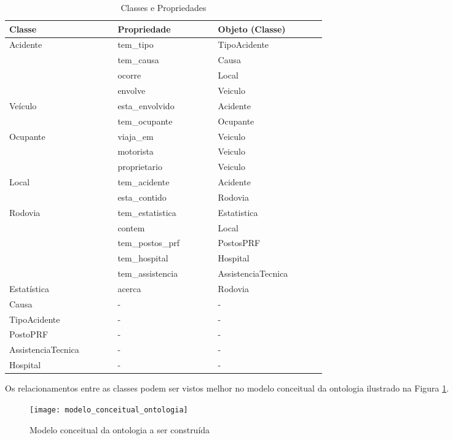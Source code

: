 	  \begin{table*}[!h]
	  \centering
	  \begin{tabular}{p{0.2\linewidth}p{0.20\linewidth}p{0.20\linewidth}}
	    \hline
	    \textbf{Classe} & \textbf{Propriedade} & \textbf{Objeto (Classe)}\\
	    \hline
	      Acidente & tem\_tipo & TipoAcidente\\
		& tem\_causa & Causa\\
		& ocorre & Local\\
		& envolve & Veiculo\\
	    \hline
	      Veículo & esta\_envolvido & Acidente\\
		& tem\_ocupante & Ocupante\\
	    \hline
	      Ocupante & viaja\_em & Veiculo\\
		& motorista & Veiculo\\
		& proprietario & Veiculo\\
	    \hline
	      Local & tem\_acidente & Acidente\\
		& esta\_contido & Rodovia\\
	    \hline
	      Rodovia & tem\_estatistica & Estatistica\\
		& contem & Local\\
		& tem\_postos\_prf & PostosPRF\\
		& tem\_hospital & Hospital\\
		& tem\_assistencia & AssistenciaTecnica\\
	    \hline
	      Estatística & acerca & Rodovia\\
	    \hline
	      Causa & - & -\\
	    \hline
	      TipoAcidente & - & -\\
	    \hline
	      PostoPRF & - & -\\
	    \hline
	      AssistenciaTecnica & - & -\\
	    \hline
	      Hospital & - & -\\
	    \hline
	  \end{tabular}
	  \caption{Classes e Propriedades}
	  \label{tab:classes}
	  \end{table*}
	  
	  Os relacionamentos entre as classes podem ser vistos melhor no modelo conceitual da ontologia ilustrado na
	  Figura \ref{fig:modelo_conceitual_ontologia}.
	  
	  \vfill
	  \pagebreak
	  \begin{figure}[!htb]
	    \centering
	    \texttt{[image: modelo\_conceitual\_ontologia]}
	    \caption[Modelo conceitual da ontologia]{Modelo conceitual da ontologia a ser construída}
	    \label{fig:modelo_conceitual_ontologia}
	  \end{figure}
	  
